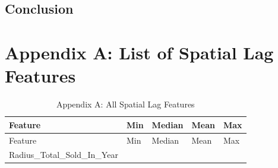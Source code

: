 \documentclass[]{article}
\begin{document}
\subsection{Conclusion}\label{conclusion}

\section{Appendix A: List of Spatial Lag
Features}\label{appendix-a-list-of-spatial-lag-features}

\begin{longtable}[]{@{}lllll@{}}
\caption{Appendix A: All Spatial Lag Features}\tabularnewline
\toprule
\begin{minipage}[b]{0.49\columnwidth}\raggedright\strut
Feature\strut
\end{minipage} & \begin{minipage}[b]{0.08\columnwidth}\raggedright\strut
Min\strut
\end{minipage} & \begin{minipage}[b]{0.09\columnwidth}\raggedright\strut
Median\strut
\end{minipage} & \begin{minipage}[b]{0.09\columnwidth}\raggedright\strut
Mean\strut
\end{minipage} & \begin{minipage}[b]{0.11\columnwidth}\raggedright\strut
Max\strut
\end{minipage}\tabularnewline
\midrule
\endfirsthead
\toprule
\begin{minipage}[b]{0.49\columnwidth}\raggedright\strut
Feature\strut
\end{minipage} & \begin{minipage}[b]{0.08\columnwidth}\raggedright\strut
Min\strut
\end{minipage} & \begin{minipage}[b]{0.09\columnwidth}\raggedright\strut
Median\strut
\end{minipage} & \begin{minipage}[b]{0.09\columnwidth}\raggedright\strut
Mean\strut
\end{minipage} & \begin{minipage}[b]{0.11\columnwidth}\raggedright\strut
Max\strut
\end{minipage}\tabularnewline
\midrule
\endhead
\begin{minipage}[t]{0.49\columnwidth}\raggedright\strut
Radius\_Total\_Sold\_In\_Year\strut
\end{minipage} & \begin{minipage}[t]{0.08\columnwidth}\raggedright\strut

\end{minipage}
\end{longtable}
\end{document}
